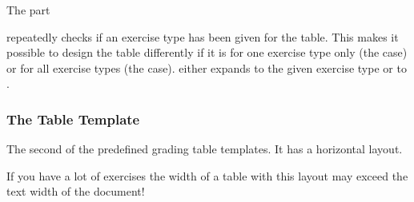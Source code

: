\documentclass{xsim-manual}
\begin{document}
\begin{sourcecode}
\end{sourcecode}

The part
\begin{sourcecode}
\end{sourcecode}
repeatedly checks if an exercise type has been given for the table.  This
makes it possible to design the table differently if it is for one exercise
type only (the  case) or for all exercise types (the 
case).   either expands to the given
exercise type or to .

\subsubsection{The  Table Template}\label{sec:table-templ-default*}
The second of the predefined grading table templates.  It has a horizontal
layout.
\begin{bewareofthedog}
  If you have a lot of exercises the width of a table with this layout may
  exceed the text width of the document!
\end{bewareofthedog}
\end{document}
